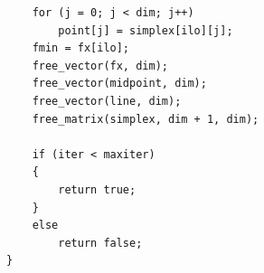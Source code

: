 \documentclass[twoside,english]{uiofysmaster}
\begin{document}
\begin{lstlisting}
	for (j = 0; j < dim; j++)
		point[j] = simplex[ilo][j];
	fmin = fx[ilo];
	free_vector(fx, dim);
	free_vector(midpoint, dim);
	free_vector(line, dim);
	free_matrix(simplex, dim + 1, dim);

	if (iter < maxiter)
	{
		return true;
	}
	else
		return false;
}
\end{lstlisting}









\end{document}
